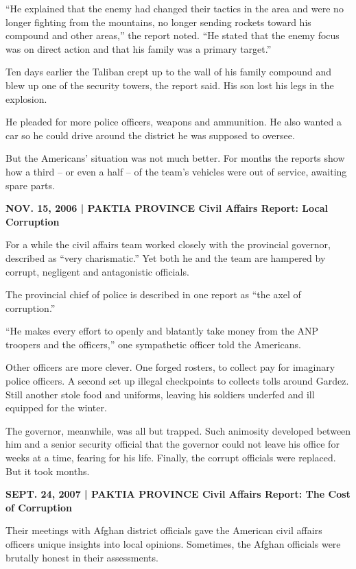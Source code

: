 ﻿\documentclass[12pt]{article}
\begin{document}
``He explained that the enemy had changed their tactics in the area and were no longer fighting from
the mountains, no longer sending rockets toward his compound and other areas,'' the report noted.
``He stated that the enemy focus was on direct action and that his family was a primary target.''

Ten days earlier the Taliban crept up to the wall of his family compound and blew up one of the
security towers, the report said. His son lost his legs in the explosion.

He pleaded for more police officers, weapons and ammunition. He also wanted a car so he could drive
around the district he was supposed to oversee.

But the Americans' situation was not much better. For months the reports show how a third -- or even
a half -- of the team's vehicles were out of service, awaiting spare parts.

\textbf{NOV. 15, 2006 | PAKTIA PROVINCE Civil Affairs Report: Local Corruption}

For a while the civil affairs team worked closely with the provincial governor, described as ``very
charismatic.'' Yet both he and the team are hampered by corrupt, negligent and antagonistic
officials.

The provincial chief of police is described in one report as ``the axel of corruption.''

``He makes every effort to openly and blatantly take money from the ANP troopers and the officers,''
one sympathetic officer told the Americans.

Other officers are more clever. One forged rosters, to collect pay for imaginary police officers. A
second set up illegal checkpoints to collects tolls around Gardez. Still another stole food and
uniforms, leaving his soldiers underfed and ill equipped for the winter.

The governor, meanwhile, was all but trapped. Such animosity developed between him and a senior
security official that the governor could not leave his office for weeks at a time, fearing for his
life. Finally, the corrupt officials were replaced. But it took months.

\textbf{SEPT. 24, 2007 | PAKTIA PROVINCE Civil Affairs Report: The Cost of Corruption}

Their meetings with Afghan district officials gave the American civil affairs officers unique
insights into local opinions. Sometimes, the Afghan officials were brutally honest in their
assessments.
\end{document}
